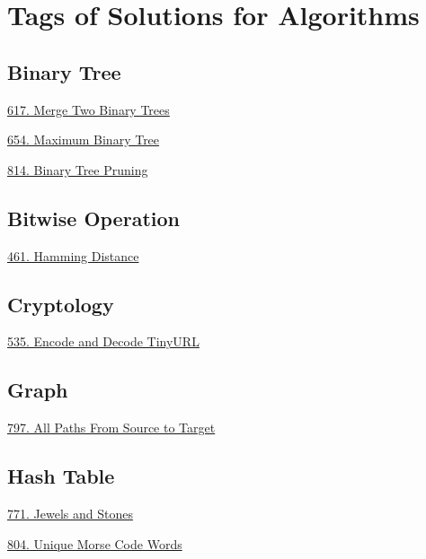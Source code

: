 \tocless\section{Tags of Solutions for Algorithms}
\label{sec:algo_tag}

\subsection*{Binary Tree}
\begin{flushleft}
    \hyperref[algo:617]{617. Merge Two Binary Trees}

    \hyperref[algo:654]{654. Maximum Binary Tree}

    \hyperref[algo:814]{814. Binary Tree Pruning}
\end{flushleft}

\subsection*{Bitwise Operation}
\begin{flushleft}
    \hyperref[algo:461]{461. Hamming Distance}
\end{flushleft}

\subsection*{Cryptology}
\begin{flushleft}
    \hyperref[algo:535]{535. Encode and Decode TinyURL}
\end{flushleft}

\subsection*{Graph}
\begin{flushleft}
    \hyperref[algo:797]{797. All Paths From Source to Target}
\end{flushleft}

\subsection*{Hash Table}
\begin{flushleft}
    \hyperref[algo:771]{771. Jewels and Stones}
    
    \hyperref[algo:804]{804. Unique Morse Code Words}
\end{flushleft}

